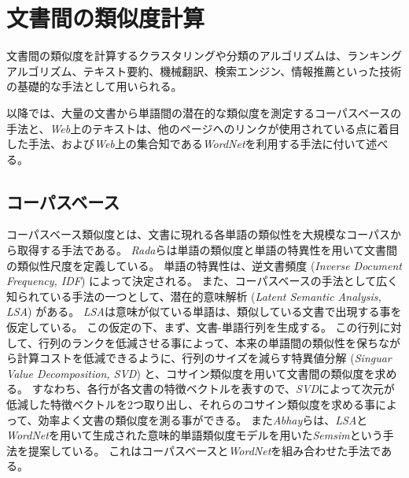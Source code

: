 \documentclass[titlepage,12pt]{jreport}
\begin{document}
\section{文書間の類似度計算}
文書間の類似度を計算するクラスタリングや分類のアルゴリズムは、ランキングアルゴリズム\cite{karen00}、テキスト要約\cite{mine97}、機械翻訳\cite{kishore16}、検索エンジン\cite{mehran06}、情報推薦\cite{ridvan07}といった技術の基礎的な手法として用いられる。

以降では、大量の文書から単語間の潜在的な類似度を測定するコーパスベースの手法と、{\it Web}上のテキストは、他のページへのリンクが使用されている点に着目した手法、および{\it Web}上の集合知である{\it WordNet}を利用する手法に付いて述べる。
\subsection{コーパスベース}
コーパスベース類似度とは、文書に現れる各単語の類似性を大規模なコーパスから取得する手法である\cite{yunus09}\cite{aminul08}。 {\it Rada}らは単語の類似度と単語の特異性を用いて文書間の類似性尺度を定義している。 単語の特異性は、逆文書頻度 ({\it Inverse Document Frequency, IDF}) によって決定される\cite{rada06}。 また、コーパスベースの手法として広く知られている手法の一つとして、潜在的意味解析 ({\it Latent Semantic Analysis, LSA}) がある。 {\it LSA}は意味が似ている単語は、類似している文書で出現する事を仮定している。 この仮定の下、まず、文書-単語行列を生成する。 この行列に対して、行列のランクを低減させる事によって、本来の単語間の類似性を保ちながら計算コストを低減できるように、行列のサイズを減らす特異値分解 ({\it Singuar Value Decomposition, SVD}) と、コサイン類似度を用いて文書間の類似度を求める。 すなわち、各行が各文書の特徴ベクトルを表すので、{\it SVD}によって次元が低減した特徴ベクトルを2つ取り出し、それらのコサイン類似度を求める事によって、効率よく文書の類似度を測る事ができる\cite{kumar16}\cite{marchin14}\cite{hongjiao15}。 また{\it Abhay}らは、{\it LSA}と{\it WordNet}を用いて生成された意味的単語類似度モデルを用いた{\it Semsim}という手法を提案している\cite{abhay16}。 これはコーパスベースと{\it WordNet}を組み合わせた手法である。
\end{document}
